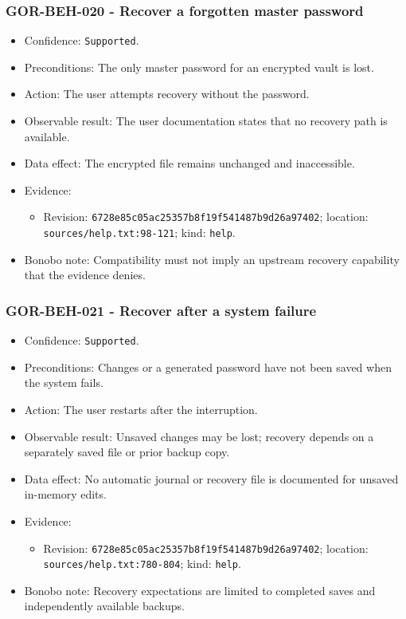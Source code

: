 \documentclass[
  letterpaper,
]{article}
\newcommand{\passthrough}[1]{#1}
\providecommand{\tightlist}{%
  \setlength{\itemsep}{0pt}\setlength{\parskip}{0pt}}
\begin{document}
\subsubsection{GOR-BEH-020 - Recover a forgotten master
password}\label{gor-beh-020---recover-a-forgotten-master-password}

\begin{itemize}
\tightlist
\item
  Confidence: \passthrough{\lstinline!Supported!}.
\item
  Preconditions: The only master password for an encrypted vault is lost.
\item
  Action: The user attempts recovery without the password.
\item
  Observable result: The user documentation states that no recovery path is available.
\item
  Data effect: The encrypted file remains unchanged and inaccessible.
\item
  Evidence:

  \begin{itemize}
  \tightlist
  \item
    Revision: \nolinkurl{6728e85c05ac25357b8f19f541487b9d26a97402}; location: \nolinkurl{sources/help.txt:98-121}; kind:
    \passthrough{\lstinline!help!}.
  \end{itemize}
\item
  Bonobo note: Compatibility must not imply an upstream recovery capability that the evidence denies.
\end{itemize}

\subsubsection{GOR-BEH-021 - Recover after a system failure}\label{gor-beh-021---recover-after-a-system-failure}

\begin{itemize}
\tightlist
\item
  Confidence: \passthrough{\lstinline!Supported!}.
\item
  Preconditions: Changes or a generated password have not been saved when the system fails.
\item
  Action: The user restarts after the interruption.
\item
  Observable result: Unsaved changes may be lost; recovery depends on a separately saved file or prior backup copy.
\item
  Data effect: No automatic journal or recovery file is documented for unsaved in-memory edits.
\item
  Evidence:

  \begin{itemize}
  \tightlist
  \item
    Revision: \nolinkurl{6728e85c05ac25357b8f19f541487b9d26a97402}; location: \nolinkurl{sources/help.txt:780-804};
    kind: \passthrough{\lstinline!help!}.
  \end{itemize}
\item
  Bonobo note: Recovery expectations are limited to completed saves and independently available backups.
\end{itemize}
\end{document}
